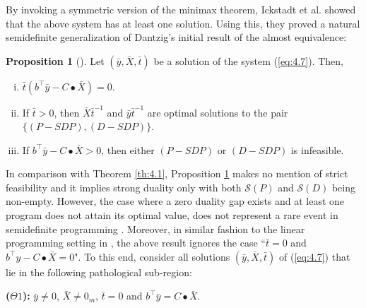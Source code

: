 \documentclass[11pt, twoside]{article}
\numberwithin{equation}{section}
\theoremstyle{definition}
\newtheorem{proposition}{Proposition}[section]
\begin{document}
By invoking a symmetric version of the minimax theorem, Ickstadt et al. \cite[Lemma 5.2]{ickstadt2024semidefinite} showed that the above system has at least one solution. Using this, they proved a natural semidefinite generalization of Dantzig's \cite{dantzig1951proof} initial result of the almost equivalence:\vspace{0.2cm}\par
\begin{proposition}[]\label{prop:ickstadt} Let $(\bar{y},\bar{X},\bar{t})$ be a solution of the system (\ref{eq:4.7}). Then,\vspace{-0.2cm}
    \begin{enumerate}[(i)]
        \item $\bar{t}(b^\top \bar{y}-C\bullet \bar{X})=0$.\vspace{-0.1cm}
        \item If $\bar{t}>0$, then $\bar{X}\bar{t}^{-1}$ and $\bar{y}\bar{t}^{-1}$ are optimal solutions to the pair \hyperlink{primaldualsdp}{$\{(P-SDP),(D-SDP)\}$}.\vspace{-0.1cm}
        \item If $b^\top \bar{y}- C\bullet \bar{X}>0$, then either \hyperlink{primalsdp}{$(P-SDP)$} or \hyperlink{dualsdp}{$(D-SDP)$} is infeasible.
    \end{enumerate}
\end{proposition}

In comparison with Theorem \ref{th:4.1},  Proposition \ref{prop:ickstadt} makes no mention of strict feasibility and it implies strong duality only with both $\mathcal{S}(P)$ and $\mathcal{S}(D)$ being non-empty. However, the case where a zero duality gap exists and at least one program does not attain its optimal value, does not represent a rare event in semidefinite programming \cite[Example 4.1.1]{wolkowicz2012handbook}. Moreover, in similar fashion to the linear programming setting in \cite{dantzig1951proof}, the above result ignores the case ``$\bar{t}=0$ and $b^\top y- C\bullet \bar{X}=0$". To this end, consider all solutions $(\bar{y},\bar{X},\bar{t})$ of (\ref{eq:4.7}) that lie in the following pathological sub-region:\vspace{0.2cm}\par
\hypertarget{theta1}{}
\noindent\textbf{($\Theta 1$):} $\bar{y}\neq 0$, $\bar{X}\neq 0_m$, $\bar{t}=0$ and $b^\top \bar{y}= C\bullet \bar{X}$.\vspace{0.2cm}\par
\end{document}
